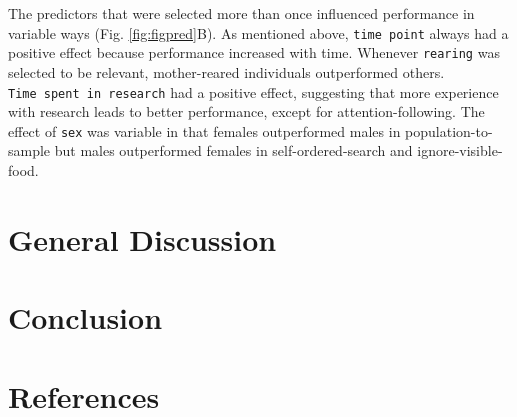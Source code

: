 \documentclass[
  man,floatsintext]{apa6}
\begin{document}
The predictors that were selected more than once influenced performance in variable ways (Fig. \ref{fig:figpred}B). As mentioned above, \texttt{time\ point} always had a positive effect because performance increased with time. Whenever \texttt{rearing} was selected to be relevant, mother-reared individuals outperformed others. \texttt{Time\ spent\ in\ research} had a positive effect, suggesting that more experience with research leads to better performance, except for attention-following. The effect of \texttt{sex} was variable in that females outperformed males in population-to-sample but males outperformed females in self-ordered-search and ignore-visible-food.

\hypertarget{general-discussion}{%
\section{General Discussion}\label{general-discussion}}

\hypertarget{conclusion}{%
\section{Conclusion}\label{conclusion}}

\newpage

\hypertarget{references}{%
\section{References}\label{references}}
\end{document}
